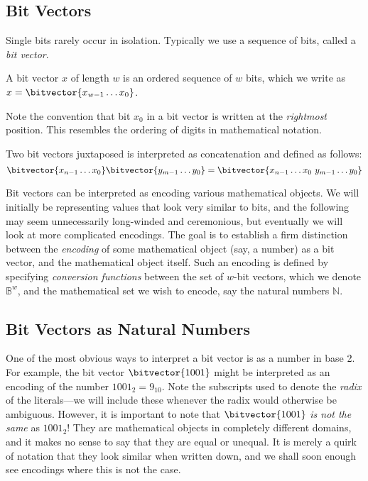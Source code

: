 \subsection{Bit Vectors}

Single bits rarely occur in isolation.  Typically we use a sequence of
bits, called a \emph{bit vector}.

\begin{definition}
  A bit vector $x$ of length $w$ is an ordered sequence of $w$ bits,
  which we write as $x=\bitvector{x_{w-1}\ldots{}x_{0}}$.
\end{definition}

Note the convention that bit $x_{0}$ in a bit vector is written at the
\emph{rightmost} position. This resembles the ordering of digits in
mathematical notation.

\begin{definition}
  Two bit vectors juxtaposed is interpreted as concatenation and
  defined as follows:
  \[
    \bitvector{x_{n-1}\ldots{}x_{0}} \bitvector{y_{m-1}\ldots{}y_{0}}
    = \bitvector{x_{n-1}\ldots{}x_{0}~y_{m-1}\ldots{}y_{0}}
  \]
\end{definition}


Bit vectors can be interpreted as encoding various mathematical
objects.  We will initially be representing values that look very
similar to bits, and the following may seem unnecessarily long-winded
and ceremonious, but eventually we will look at more complicated
encodings.  The goal is to establish a firm distinction between the
\emph{encoding} of some mathematical object (say, a number) as a bit
vector, and the mathematical object itself.  Such an encoding is
defined by specifying \emph{conversion functions} between the set of
$w$-bit vectors, which we denote $\mathbb{B}^{w}$, and the
mathematical set we wish to encode, say the natural numbers
$\mathbb{N}$.

\subsection{Bit Vectors as Natural Numbers}
\label{sec:bitnats}

One of the most obvious ways to interpret a bit vector is as a number
in base 2. For example, the bit vector $\bitvector{1001}$ might be
interpreted as an encoding of the number $1001_{2} = 9_{10}$. Note the
subscripts used to denote the \emph{radix} of the literals---we will
include these whenever the radix would otherwise be ambiguous.
However, it is important to note that $\bitvector{1001}$ \emph{is not
  the same} as $1001_{2}$! They are mathematical objects in completely
different domains, and it makes no sense to say that they are equal or
unequal. It is merely a quirk of notation that they look similar when
written down, and we shall soon enough see encodings where this is not
the case.

